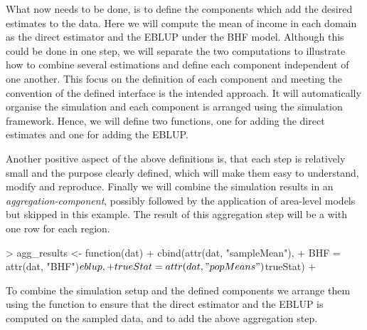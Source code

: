 \documentclass[article]{ajs}
\begin{document}
What now needs to be done, is to define the components which add the desired estimates to the data. Here we will compute the mean of income in each domain as the direct estimator and the EBLUP under the BHF model. Although this could be done in one step, we will separate the two computations to illustrate how to combine several estimations and define each component independent of one another. This focus on the definition of each component and meeting the convention of the defined interface is the intended approach. It will automatically organise the simulation and each component is arranged using the simulation framework. Hence, we will define two functions, one for adding the direct estimates and one for adding the EBLUP.

\begin{Schunk}
\end{Schunk}

Another positive aspect of the above definitions is, that each step is relatively small and the purpose clearly defined, which will make them easy to understand, modify and reproduce. Finally we will combine the simulation results in an \textit{aggregation-component}, possibly followed by the application of area-level models but skipped in this example. The result of this aggregation step will be a  with one row for each region.

\begin{Schunk}
\begin{Sinput}
> agg_results <- function(dat) {
+   cbind(attr(dat, "sampleMean"),
+         BHF = attr(dat, "BHF")$eblup,
+         trueStat = attr(dat, "popMeans")$trueStat)
+ }
\end{Sinput}
\end{Schunk}

To combine the simulation setup and the defined components we arrange them using the function  to ensure that the direct estimator and the EBLUP is computed on the sampled data, and  to add the above aggregation step.
\end{document}
